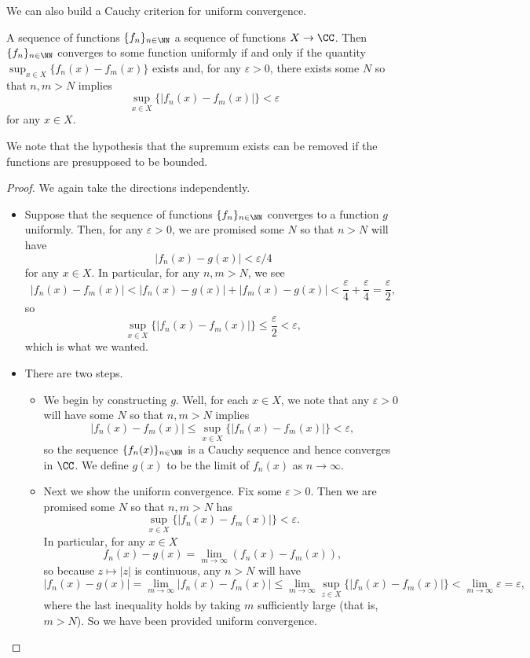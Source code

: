 We can also build a Cauchy criterion for uniform convergence.
\begin{prop} \label{prop:betteruniformconverge}
	A sequence of functions $\{f_n\}_{n\in\NN}$ a sequence of functions $X\to\CC$. Then $\{f_n\}_{n\in\NN}$ converges to some function uniformly if and only if the quantity $\sup_{x\in X}\{f_n(x)-f_m(x)\}$ exists and, for any $\varepsilon>0$, there exists some $N$ so that $n,m>N$ implies
	\[\sup_{x\in X}\{|f_n(x)-f_m(x)|\}<\varepsilon\]
	for any $x\in X$.
\end{prop}
We note that the hypothesis that the supremum exists can be removed if the functions are presupposed to be bounded.
\begin{proof}
	We again take the directions independently.
	\begin{itemize}
		\item Suppose that the sequence of functions $\{f_n\}_{n\in\NN}$ converges to a function $g$ uniformly. Then, for any $\varepsilon>0$, we are promised some $N$ so that $n>N$ will have
		\[|f_n(x)-g(x)|<\varepsilon/4\]
		for any $x\in X$. In particular, for any $n,m>N$, we see
		\[|f_n(x)-f_m(x)|<|f_n(x)-g(x)|+|f_m(x)-g(x)|<\frac\varepsilon4+\frac\varepsilon4=\frac\varepsilon2,\]
		so
		\[\sup_{x\in X}\{|f_n(x)-f_m(x)|\}\le\frac\varepsilon2<\varepsilon,\]
		which is what we wanted.
		\item There are two steps.
		\begin{itemize}
			\item We begin by constructing $g$. Well, for each $x\in X$, we note that any $\varepsilon>0$ will have some $N$ so that $n,m>N$ implies
			\[|f_n(x)-f_m(x)|\le\sup_{x\in X}\{|f_n(x)-f_m(x)|\}<\varepsilon,\]
			so the sequence $\{f_n(x)\}_{n\in\NN}$ is a Cauchy sequence and hence converges in $\CC$. We define $g(x)$ to be the limit of $f_n(x)$ as $n\to\infty$.
			\item Next we show the uniform convergence. Fix some $\varepsilon>0$. Then we are promised some $N$ so that $n,m>N$ has
			\[\sup_{x\in X}\{|f_n(x)-f_m(x)|\}<\varepsilon.\]
			In particular, for any $x\in X$
			\[f_n(x)-g(x)=\lim_{m\to\infty}(f_n(x)-f_m(x)),\]
			so because $z\mapsto|z|$ is continuous, any $n>N$ will have
			\[|f_n(x)-g(x)|=\lim_{m\to\infty}|f_n(x)-f_m(x)|\le\lim_{m\to\infty}\sup_{z\in X}\{|f_n(x)-f_m(x)|\}<\lim_{m\to\infty}\varepsilon=\varepsilon,\]
			where the last inequality holds by taking $m$ sufficiently large (that is, $m>N$). So we have been provided uniform convergence.
			\qedhere
		\end{itemize}
	\end{itemize}
\end{proof}
